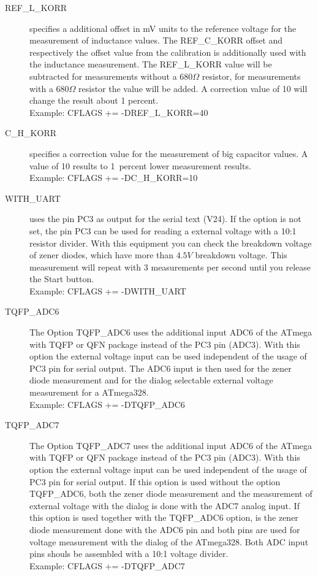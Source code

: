 \begin{description}
  \item[REF\_L\_KORR] specifies a additional offset in mV units to the reference voltage for the measurement of
inductance values. 
The REF\_C\_KORR offset and respectively the offset value from the calibration is additionally used with the inductance measurement.
The REF\_L\_KORR value will be subtracted for measurements without a \(680\Omega\) resistor,
for measurements with a \(680\Omega\) resistor the value will be added.
A correction value of 10 will change the result about 1 percent.\\
Example: CFLAGS += -DREF\_L\_KORR=40

  \item[C\_H\_KORR] specifies a correction value for the measurement of big capacitor values.
A value of 10 results to 1~percent lower measurement results.\\
Example:  CFLAGS += -DC\_H\_KORR=10

  \item[WITH\_UART] uses the pin PC3 as output for the serial text (V24).
If the option is not set, the pin PC3 can be used for reading a external voltage with a 10:1 resistor divider.
With this equipment you can check the breakdown voltage of zener diodes, which have more than \(4.5V\) breakdown voltage.
This measurement will repeat with 3 measurements per second until you release the Start button.\\
Example: CFLAGS += -DWITH\_UART

  \item[TQFP\_ADC6] The Option TQFP\_ADC6 uses the additional input ADC6 of the ATmega with TQFP or QFN package instead of
the PC3 pin (ADC3).
With this option the external voltage input can be used independent of the usage of PC3 pin for serial output.
The ADC6 input is then used for the zener diode measurement and for the dialog selectable external voltage measurement
for a ATmega328.\\
Example: CFLAGS += -DTQFP\_ADC6

  \item[TQFP\_ADC7] The Option TQFP\_ADC7 uses the additional input ADC6 of the ATmega with TQFP or QFN package instead of
the PC3 pin (ADC3).
With this option the external voltage input can be used independent of the usage of PC3 pin for serial output.
If this option is used without the option TQFP\_ADC6, both the zener diode measurement and the measurement of external voltage
with the dialog is done with the ADC7 analog input.
If this option is used together with the TQFP\_ADC6 option, is the zener diode measurement done with the ADC6 pin and
both pins are used for voltage measurement with the dialog of the ATmega328.
Both ADC input pins shouls be assembled with a 10:1 voltage divider.\\
Example: CFLAGS += -DTQFP\_ADC7


\end{description}
